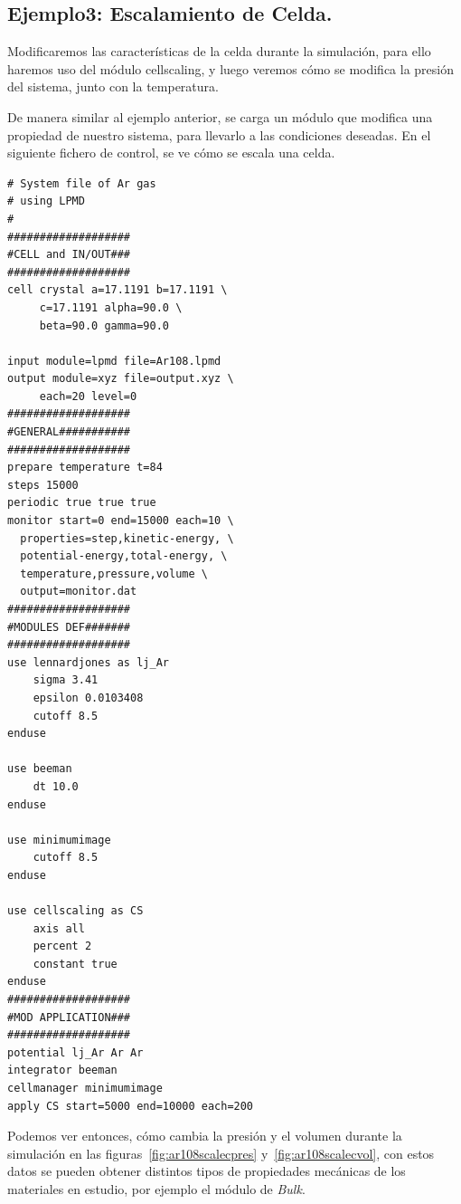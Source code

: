 \subsection{Ejemplo3: Escalamiento de Celda.}

Modificaremos las caracter\'isticas de la celda durante la simulaci\'on, para ello haremos uso del m\'odulo cellscaling, y luego veremos c\'omo se modifica la presi\'on del sistema, junto con la temperatura.

De manera similar al ejemplo anterior, se carga un m\'odulo que modifica una propiedad de nuestro sistema, para llevarlo a las condiciones deseadas. En el siguiente fichero de control, se ve c\'omo se escala una celda.

\begin{multicols}{2}
\setlength{\columnseprule}{.5pt}
\begin{verbatim}
# System file of Ar gas 
# using LPMD
#
###################
#CELL and IN/OUT###
###################
cell crystal a=17.1191 b=17.1191 \
     c=17.1191 alpha=90.0 \
     beta=90.0 gamma=90.0

input module=lpmd file=Ar108.lpmd
output module=xyz file=output.xyz \
     each=20 level=0
###################
#GENERAL###########
###################
prepare temperature t=84
steps 15000
periodic true true true
monitor start=0 end=15000 each=10 \
  properties=step,kinetic-energy, \
  potential-energy,total-energy, \
  temperature,pressure,volume \
  output=monitor.dat
###################
#MODULES DEF#######
###################
use lennardjones as lj_Ar
    sigma 3.41
    epsilon 0.0103408
    cutoff 8.5
enduse

use beeman
    dt 10.0
enduse

use minimumimage
    cutoff 8.5
enduse

use cellscaling as CS
    axis all
    percent 2
    constant true
enduse
###################
#MOD APPLICATION###
###################
potential lj_Ar Ar Ar
integrator beeman
cellmanager minimumimage
apply CS start=5000 end=10000 each=200
\end{verbatim}
\end{multicols}

Podemos ver entonces, c\'omo cambia la presi\'on y el volumen durante la simulaci\'on en las figuras~\ref{fig:ar108scalecpres} y~\ref{fig:ar108scalecvol}, con estos datos se pueden obtener distintos tipos de propiedades mec\'anicas de los materiales en estudio, por ejemplo el m\'odulo de \textit{Bulk}.

